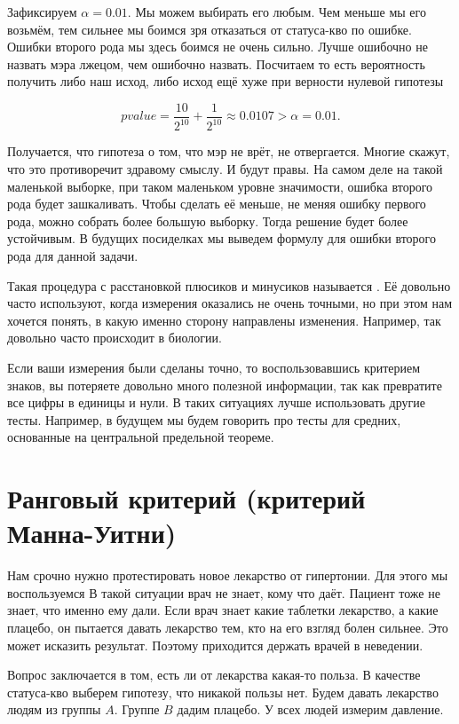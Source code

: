 \documentclass[12pt, a4paper, oneside]{article}
\begin{document}
Зафиксируем  $\alpha = 0.01.$ Мы можем выбирать его любым. Чем меньше мы его возьмём, тем сильнее мы боимся зря отказаться от статуса-кво по ошибке. Ошибки второго рода мы здесь боимся не очень сильно. Лучше ошибочно не назвать мэра лжецом, чем ошибочно назвать. Посчитаем  то есть вероятность получить либо наш исход, либо исход ещё хуже при верности нулевой гипотезы 

\[
pvalue = \frac{10}{2^{10}} + \frac{1}{2^{10}} \approx 0.0107 > \alpha = 0.01.
\]

Получается, что гипотеза о том, что мэр не врёт, не отвергается. Многие скажут, что это противоречит здравому смыслу. И будут правы. На самом деле на такой маленькой выборке, при таком маленьком уровне значимости, ошибка второго рода будет зашкаливать. Чтобы сделать её меньше, не меняя ошибку первого рода, можно собрать более большую выборку. Тогда решение будет более устойчивым. В будущих посиделках мы выведем формулу для ошибки второго рода для данной задачи. 

Такая процедура с расстановкой плюсиков и минусиков называется . Её довольно часто используют, когда измерения оказались не очень точными, но при этом нам хочется понять, в какую именно сторону направлены изменения. Например, так довольно часто происходит в биологии. 

Если ваши измерения были сделаны точно, то воспользовавшись критерием знаков, вы потеряете довольно много полезной информации, так как превратите все цифры в единицы и нули. В таких ситуациях лучше использовать другие тесты. Например, в будущем мы будем говорить про тесты для средних, основанные на центральной предельной теореме.  

\section{Ранговый критерий (критерий Манна-Уитни)}

Нам срочно нужно протестировать новое лекарство от гипертонии. Для этого мы воспользуемся  В такой ситуации врач не знает, кому что даёт. Пациент тоже не знает, что именно ему дали. Если врач знает какие таблетки лекарство, а какие плацебо, он пытается давать лекарство тем, кто на его взгляд болен сильнее. Это может исказить результат. Поэтому приходится держать врачей в неведении. 

Вопрос заключается в том, есть ли от лекарства какая-то польза. В качестве статуса-кво выберем гипотезу, что никакой пользы нет. Будем давать лекарство людям из группы $A$. Группе $B$ дадим плацебо. У всех людей измерим давление. 
\end{document}
